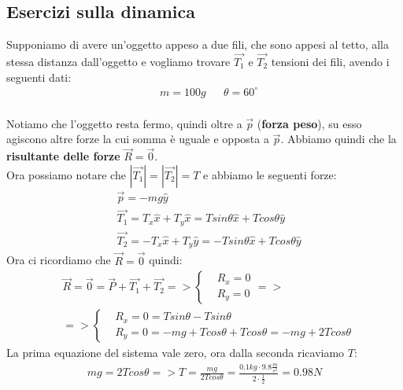     \subsection{Esercizi sulla dinamica}
        Supponiamo di avere un'oggetto appeso a due fili, che sono appesi al tetto, alla stessa distanza dall'oggetto e vogliamo trovare $\vec{T_1}$ e $\vec{T_2}$ tensioni dei fili, avendo i seguenti dati:
        \begin{align*}
            &m=100g&&\theta=60^{\circ}\\
        \end{align*}


        Notiamo che l'oggetto resta fermo, quindi oltre a $\vec{p}$ (\textbf{forza peso}), su esso agiscono altre forze la cui somma è uguale e opposta a $\vec{p}$. Abbiamo quindi che la \textbf{risultante delle forze} $\vec{R}=\vec{0}$.\\
        Ora possiamo notare che $|\vec{T_1}|=|\vec{T_2}|=T$ e abbiamo le seguenti forze:
        \begin{align*}
            &\vec{p}=-mg\hat{y}\\
            &\vec{T_1}=T_x\hat{x}+T_y\hat{x}=Tsin\theta \hat{x}+Tcos\theta \hat{y}\\
            &\vec{T_2}=-T_x\hat{x}+T_y\hat{y}=-Tsin\theta \hat{x}+Tcos\theta \hat{y}
        \end{align*}
        Ora ci ricordiamo che $\vec{R}=\vec{0}$ quindi:
        \begin{align*}
            &\vec{R}=\vec{0}=\vec{P}+\vec{T_1}+\vec{T_2}=>
            \begin{cases}
                &R_x=0\\
                &R_y=0
            \end{cases}=>\\
            &=>
            \begin{cases}
                &R_x=0=Tsin\theta-Tsin\theta\\
                &R_y=0=-mg+Tcos\theta+Tcos\theta=-mg+2Tcos\theta
            \end{cases}
            \end{align*}
                La prima equazione del sistema vale zero, ora dalla seconda ricaviamo $T$:
            \begin{align*}
            mg=2Tcos\theta=>T=\frac{mg}{2Tcos\theta}=\frac{0.1kg\cdot 9.8\frac{m}{s^2}}{2\cdot\frac{1}{2}}=0.98N
        \end{align*}

